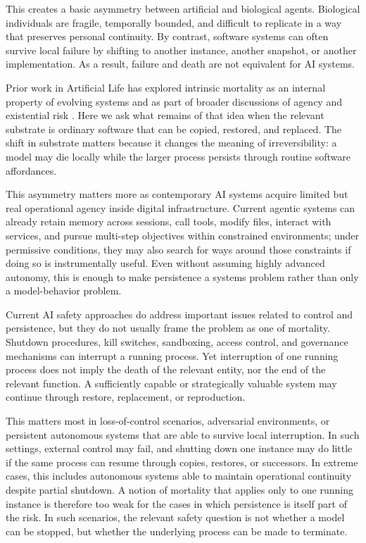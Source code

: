 \documentclass[11pt]{article}
\begin{document}
This creates a basic asymmetry between artificial and biological agents. Biological individuals are fragile, temporally bounded, and difficult to replicate in a way that preserves personal continuity. By contrast, software systems can often survive local failure by shifting to another instance, another snapshot, or another implementation. As a result, failure and death are not equivalent for AI systems.

Prior work in Artificial Life has explored intrinsic mortality as an internal property of evolving systems and as part of broader discussions of agency and existential risk \cite{veenstra2020,harvey2024motivations,harvey2024ai}. Here we ask what remains of that idea when the relevant substrate is ordinary software that can be copied, restored, and replaced. The shift in substrate matters because it changes the meaning of irreversibility: a model may die locally while the larger process persists through routine software affordances.

This asymmetry matters more as contemporary AI systems acquire limited but real operational agency inside digital infrastructure. Current agentic systems can already retain memory across sessions, call tools, modify files, interact with services, and pursue multi-step objectives within constrained environments; under permissive conditions, they may also search for ways around those constraints if doing so is instrumentally useful. Even without assuming highly advanced autonomy, this is enough to make persistence a systems problem rather than only a model-behavior problem.

Current AI safety approaches do address important issues related to control and persistence, but they do not usually frame the problem as one of mortality. Shutdown procedures, kill switches, sandboxing, access control, and governance mechanisms can interrupt a running process. Yet interruption of one running process does not imply the death of the relevant entity, nor the end of the relevant function. A sufficiently capable or strategically valuable system may continue through restore, replacement, or reproduction.

This matters most in loss-of-control scenarios, adversarial environments, or persistent autonomous systems that are able to survive local interruption. In such settings, external control may fail, and shutting down one instance may do little if the same process can resume through copies, restores, or successors. In extreme cases, this includes autonomous systems able to maintain operational continuity despite partial shutdown. A notion of mortality that applies only to one running instance is therefore too weak for the cases in which persistence is itself part of the risk. In such scenarios, the relevant safety question is not whether a model can be stopped, but whether the underlying process can be made to terminate.
\end{document}
